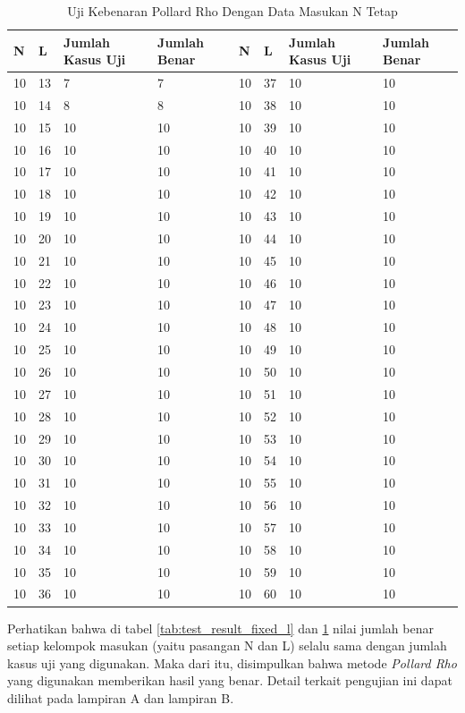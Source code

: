 \begin{table}[h!]
\caption{Uji Kebenaran Pollard Rho Dengan Data Masukan N Tetap}
\label{tab:test_result_fixed_n}
\begin{tabularx} {\linewidth}{ |l l X X|l l X X| }
\hline
N	&L	&Jumlah Kasus Uji	&Jumlah Benar	&N	&L	&Jumlah Kasus Uji	&Jumlah Benar \\
\hline
10	&13	&7					&7				&10	&37	&10					&10 \\
10	&14	&8					&8				&10	&38	&10					&10 \\
10	&15	&10					&10				&10	&39	&10					&10 \\
10	&16	&10					&10				&10	&40	&10					&10 \\
10	&17	&10					&10				&10	&41	&10					&10 \\
10	&18	&10					&10				&10	&42	&10					&10 \\
10	&19	&10					&10				&10	&43	&10					&10 \\
10	&20	&10					&10				&10	&44	&10					&10 \\
10	&21	&10					&10				&10	&45	&10					&10 \\
10	&22	&10					&10				&10	&46	&10					&10 \\
10	&23	&10					&10				&10	&47	&10					&10 \\
10	&24	&10					&10				&10	&48	&10					&10 \\
10	&25	&10					&10				&10	&49	&10					&10 \\
10	&26	&10					&10				&10	&50	&10					&10 \\
10	&27	&10					&10				&10	&51	&10					&10 \\
10	&28	&10					&10				&10	&52	&10					&10 \\
10	&29	&10					&10				&10	&53	&10					&10 \\
10	&30	&10					&10				&10	&54	&10					&10 \\
10	&31	&10					&10				&10	&55	&10					&10 \\
10	&32	&10					&10				&10	&56	&10					&10 \\
10	&33	&10					&10				&10	&57	&10					&10 \\
10	&34	&10					&10				&10	&58	&10					&10 \\
10	&35	&10					&10				&10	&59	&10					&10 \\
10	&36	&10					&10				&10	&60	&10					&10 \\
\hline
\end{tabularx}
\end{table}
\pagebreak

Perhatikan bahwa di tabel \ref{tab:test_result_fixed_l} dan \ref{tab:test_result_fixed_n} nilai jumlah benar setiap kelompok masukan (yaitu pasangan N dan L) selalu sama dengan jumlah kasus uji yang digunakan. Maka dari itu, disimpulkan bahwa metode \textit{Pollard Rho} yang digunakan memberikan hasil yang benar. Detail terkait pengujian ini dapat dilihat pada lampiran A dan lampiran B.

